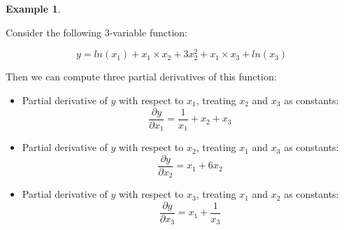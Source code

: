 \documentclass[
]{book}
\theoremstyle{definition}
\theoremstyle{definition}
\newtheorem{example}{Example}[chapter]
\theoremstyle{definition}
\theoremstyle{definition}
\theoremstyle{remark}
\begin{document}
\begin{example}
\protect\hypertarget{exm:unnamed-chunk-8}{}\label{exm:unnamed-chunk-8}

Consider the following 3-variable function:

\[y=ln(x_1)+x_1\times x_2+3x_2^2 + x_1 \times x_3 + ln(x_3)\]

Then we can compute three partial derivatives of this function:

\begin{itemize}
\item
  Partial derivative of \(y\) with respect to \(x_1\), treating \(x_2\) and \(x_3\) as constants:
  \[\frac{\partial y}{\partial x_1} = \frac{1}{x_1} + x_2+x_3\]
\item
  Partial derivative of \(y\) with respect to \(x_2\), treating \(x_1\) and \(x_3\) as constants:
  \[\frac{\partial y}{\partial x_2} = x_1+6x_2\]
\item
  Partial derivative of \(y\) with respect to \(x_3\), treating \(x_1\) and \(x_2\) as constants:
  \[\frac{\partial y}{\partial x_3} = x_1+ \frac{1}{x_3}\]
\end{itemize}

\end{example}
\end{document}
